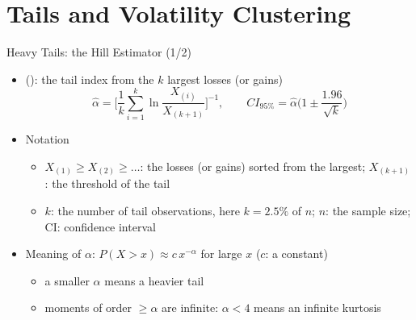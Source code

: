 \section{Tails and Volatility Clustering}

\begin{frame}{Heavy Tails: the Hill Estimator (1/2)}
\itemsize{\small}
\begin{itemize}
    \item {} (): the tail index from the $k$ largest losses (or gains) \[ \hat\alpha = \Big[\frac1k\sum_{i=1}^k \ln\frac{X_{(i)}}{X_{(k+1)}}\Big]^{-1}, \qquad CI_{95\%} = \hat\alpha\Big(1 \pm \frac{1.96}{\sqrt{k}}\Big) \]
    \item Notation
    \begin{itemize}
        \item $X_{(1)} \ge X_{(2)} \ge \dots$: the losses (or gains) sorted from the largest; $X_{(k+1)}$: the threshold of the tail
        \item $k$: the number of tail observations, here $k = 2.5\%$ of $n$; $n$: the sample size; CI: confidence interval
    \end{itemize}
    \item Meaning of $\alpha$: $P(X > x) \approx c\,x^{-\alpha}$ for large $x$ ($c$: a constant)
    \begin{itemize}
        \item a smaller $\alpha$ means a heavier tail
        \item moments of order $\ge \alpha$ are infinite: $\alpha < 4$ means an infinite kurtosis
    \end{itemize}
\end{itemize}
\end{frame}

